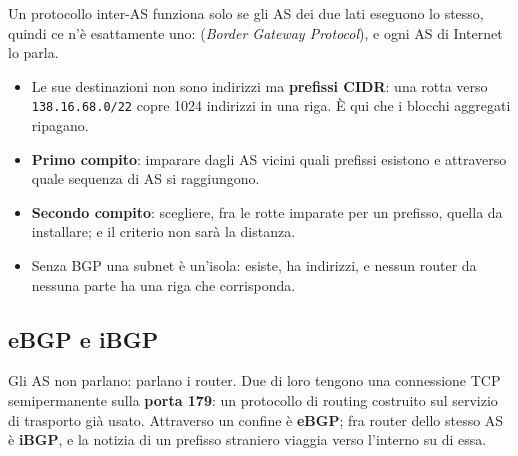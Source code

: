 Un protocollo inter-AS funziona solo se gli AS dei due lati eseguono lo stesso, quindi ce n'è esattamente uno: 
(\emph{Border Gateway Protocol}), e ogni AS di Internet lo parla.
\begin{itemize}
    \item Le sue destinazioni non sono indirizzi ma \textbf{prefissi CIDR}: una rotta verso \texttt{138.16.68.0/22} copre 1024
          indirizzi in una riga. È qui che i blocchi aggregati ripagano.
    \item \textbf{Primo compito}: imparare dagli AS vicini quali prefissi esistono e attraverso quale sequenza di AS si raggiungono.
    \item \textbf{Secondo compito}: scegliere, fra le rotte imparate per un prefisso, quella da installare; e il criterio non sarà la
          distanza.
    \item Senza BGP una subnet è un'isola: esiste, ha indirizzi, e nessun router da nessuna parte ha una riga che corrisponda.
\end{itemize}

\subsection{eBGP e iBGP}

Gli AS non parlano: parlano i router. Due di loro tengono una connessione TCP semipermanente sulla \textbf{porta 179}: un
protocollo di routing costruito sul servizio di trasporto già usato. Attraverso un confine è \textbf{eBGP}; fra router dello stesso
AS è \textbf{iBGP}, e la notizia di un prefisso straniero viaggia verso l'interno su di essa.


